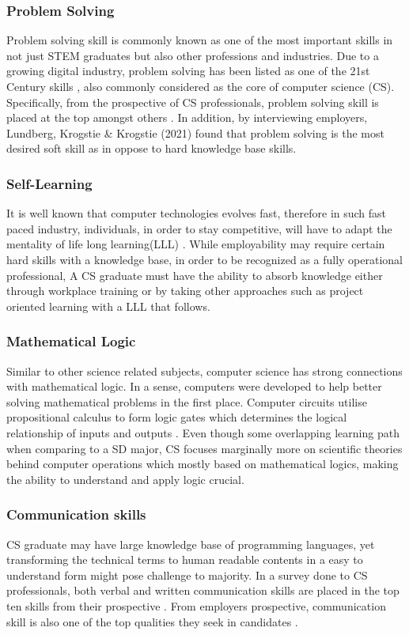 \documentclass[a4paper, 11pt]{report}
\begin{document}
\subsubsection{Problem Solving}
Problem solving skill is commonly known as one of the most important skills in not just STEM graduates but also other professions and industries. Due to a growing digital industry, problem solving has been listed as one of the 21st Century skills \cite{voogt201021st}, also commonly considered as the core of computer science (CS). Specifically, from the prospective of CS professionals, problem solving skill is placed at the top amongst others \cite{exter2018comparing}. In addition, by interviewing employers, Lundberg, Krogstie \& Krogstie (2021) found that problem solving is the most desired soft skill as in oppose to hard knowledge base skills.
\subsubsection{Self-Learning}
It is well known that computer technologies evolves fast, therefore in such fast paced industry, individuals, in order to stay competitive, will have to adapt the mentality of life long learning(LLL) \cite{borjesson2007continuing}. While employability may require certain hard skills with a knowledge base, in order to be recognized as a fully operational professional, A CS graduate must have the ability to absorb knowledge either through workplace training or by taking other approaches such as project oriented learning with a LLL that follows.
\subsubsection{Mathematical Logic}
Similar to other science related subjects, computer science has strong connections with mathematical logic. In a sense, computers were developed to help better solving mathematical problems in the first place. Computer circuits utilise propositional calculus to form logic gates which determines the logical relationship of inputs and outputs \cite{ben2012mathematical}. Even though some overlapping learning path when comparing to a SD major, CS focuses marginally more on scientific theories behind computer operations which mostly based on mathematical logics, making the ability to understand and apply logic crucial.
\subsubsection{Communication skills}
CS graduate may have large knowledge base of programming languages, yet transforming the technical terms to human readable contents in a easy to understand form might pose challenge to majority. In a survey done to CS professionals, both verbal and written communication skills are placed in the top ten skills from their prospective \cite{exter2018comparing}. From employers prospective, communication skill is also one of the top qualities they seek in candidates \cite{lundberg2021employable}.
\end{document}
